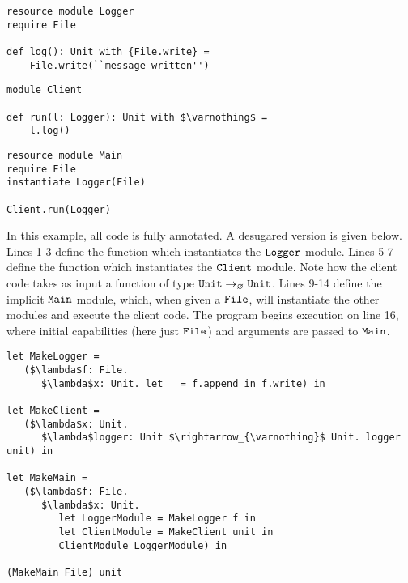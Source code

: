 \begin{lstlisting}
resource module Logger
require File

def log(): Unit with {File.write} =
    File.write(``message written'')
\end{lstlisting}

\begin{lstlisting}
module Client

def run(l: Logger): Unit with $\varnothing$ =
    l.log()
\end{lstlisting}

\begin{lstlisting}
resource module Main
require File
instantiate Logger(File)

Client.run(Logger)
\end{lstlisting}

In this example, all code is fully annotated. A desugared version is given below. Lines 1-3 define the function which instantiates the $\mathtt{Logger}$ module. Lines 5-7 define the function which instantiates the $\mathtt{Client}$ module. Note how the client code takes as input a function of type $\mathtt{Unit} \rightarrow_{\varnothing} \mathtt{Unit}$. Lines 9-14 define the implicit $\mathtt{Main}$ module, which, when given a $\mathtt{File}$, will instantiate the other modules and execute the client code. The program begins execution on line 16, where initial capabilities (here just $\mathtt{File}$) and arguments are passed to $\mathtt{Main}$.

\begin{lstlisting}
let MakeLogger =
   ($\lambda$f: File.
      $\lambda$x: Unit. let _ = f.append in f.write) in
           
let MakeClient =
   ($\lambda$x: Unit.
      $\lambda$logger: Unit $\rightarrow_{\varnothing}$ Unit. logger unit) in
                  
let MakeMain =
   ($\lambda$f: File.
      $\lambda$x: Unit.
         let LoggerModule = MakeLogger f in
         let ClientModule = MakeClient unit in
         ClientModule LoggerModule) in

(MakeMain File) unit
\end{lstlisting}

